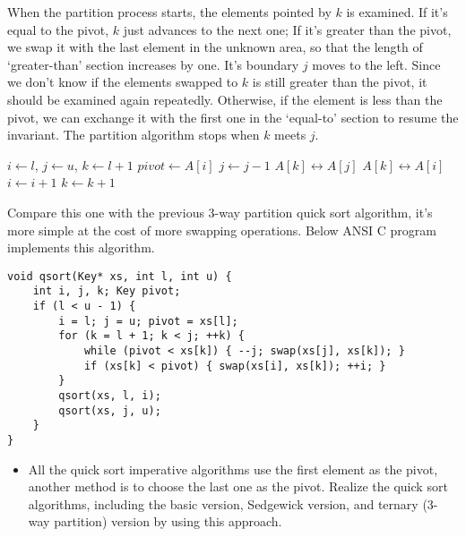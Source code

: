 \documentclass[UTF8]{article}
\begin{document}
When the partition process starts, the elements pointed by $k$ is examined. If it's equal to
the pivot, $k$ just advances to the next one; If it's greater than the pivot, we swap it with
the last element in the unknown area, so that the length of `greater-than' section increases
by one. It's boundary $j$ moves to the left. Since we don't know if the elements swapped to $k$
is still greater than the pivot, it should be examined again repeatedly. Otherwise, if the
element is less than the pivot, we can exchange it with the first one in the `equal-to' section
to resume the invariant. The partition algorithm stops when $k$ meets $j$.

\begin{algorithmic}[1]
    \State $i \gets l$, $j \gets u$, $k \gets l + 1$
    \State $pivot \gets A[i]$
        \State $j \gets j - 1$
        \State {} $A[k] \leftrightarrow A[j]$
      \EndWhile
        \State {} $A[k] \leftrightarrow A[i]$
        \State $i \gets i + 1$
      \EndIf
      \State $k \gets k + 1$
    \EndWhile
    \State {}
    \State {}
  \EndIf
\EndProcedure
\end{algorithmic}

Compare this one with the previous 3-way partition quick sort algorithm, it's more
simple at the cost of more swapping operations. Below ANSI C program implements this
algorithm.

\lstset{language=C}
\begin{lstlisting}
void qsort(Key* xs, int l, int u) {
    int i, j, k; Key pivot;
    if (l < u - 1) {
        i = l; j = u; pivot = xs[l];
        for (k = l + 1; k < j; ++k) {
            while (pivot < xs[k]) { --j; swap(xs[j], xs[k]); }
            if (xs[k] < pivot) { swap(xs[i], xs[k]); ++i; }
        }
        qsort(xs, l, i);
        qsort(xs, j, u);
    }
}
\end{lstlisting}

\begin{Exercise}
\begin{itemize}
\item All the quick sort imperative algorithms use the first element as the pivot, another method is to choose the
last one as the pivot. Realize the quick sort algorithms, including the basic version, Sedgewick version, and
ternary (3-way partition) version by using this approach.
\end{itemize}
\end{Exercise}
\end{document}
